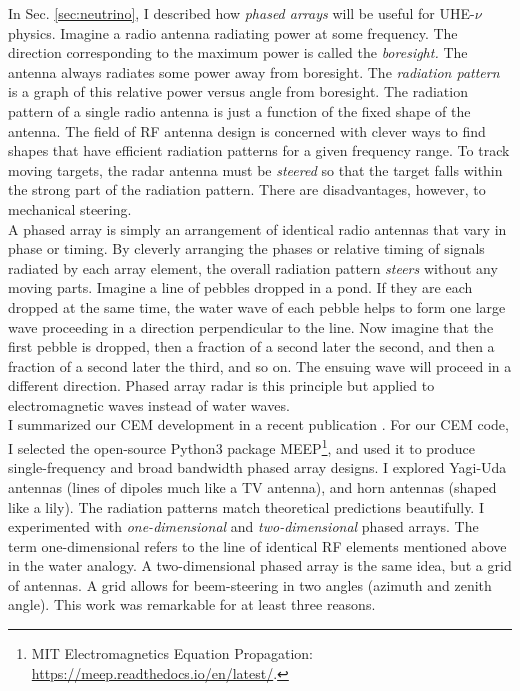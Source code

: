 \documentclass[../../../main.tex]{subfiles}
\begin{document}
In Sec. \ref{sec:neutrino}, I described how \textit{phased arrays} will be useful for UHE-$\nu$ physics.  Imagine a radio antenna radiating power at some frequency.  The direction corresponding to the maximum power is called the \textit{boresight.}  The antenna always radiates some power away from boresight.  The \textit{radiation pattern} is a graph of this relative power versus angle from boresight.  The radiation pattern of a single radio antenna is just a function of the fixed shape of the antenna.  The field of RF antenna design is concerned with clever ways to find shapes that have efficient radiation patterns for a given frequency range.  To track moving targets, the radar antenna must be \textit{steered} so that the target falls within the strong part of the radiation pattern.  There are disadvantages, however, to mechanical steering.
\\
\vspace{0.25cm}
A phased array is simply an arrangement of identical radio antennas that vary in phase or timing.  By cleverly arranging the phases or relative timing of signals radiated by each array element, the overall radiation pattern \textit{steers} without any moving parts.  Imagine a line of pebbles dropped in a pond.  If they are each dropped at the same time, the water wave of each pebble helps to form one large wave proceeding in a direction perpendicular to the line.  Now imagine that the first pebble is dropped, then a fraction of a second later the second, and then a fraction of a second later the third, and so on.  The ensuing wave will proceed in a different direction.  Phased array radar is this principle but applied to electromagnetic waves instead of water waves.
\\
\vspace{0.25cm}
I summarized our CEM development in a recent publication \cite{electronics10040415}.  For our CEM code, I selected the open-source Python3 package MEEP\footnote{MIT Electromagnetics Equation Propagation: \url{https://meep.readthedocs.io/en/latest/}.}, and used it to produce single-frequency and broad bandwidth phased array designs.  I explored Yagi-Uda antennas (lines of dipoles much like a TV antenna), and horn antennas (shaped like a lily).  The radiation patterns match theoretical predictions beautifully.  I experimented with \textit{one-dimensional} and \textit{two-dimensional} phased arrays.  The term one-dimensional refers to the line of identical RF elements mentioned above in the water analogy.  A two-dimensional phased array is the same idea, but a grid of antennas.  A grid allows for beem-steering in two angles (azimuth and zenith angle).  This work was remarkable for at least three reasons.
\end{document}

